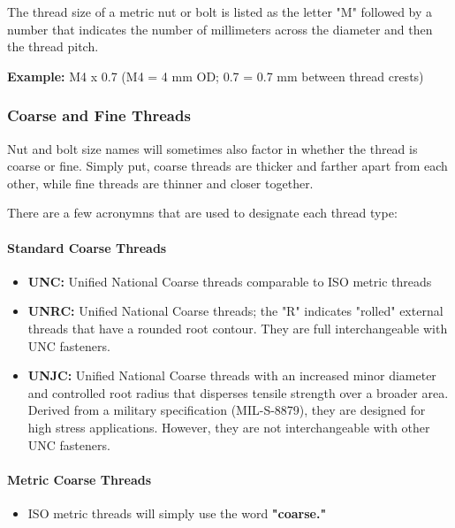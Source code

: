 \documentclass[english,]{article}
\providecommand{\tightlist}{%
  \setlength{\itemsep}{0pt}\setlength{\parskip}{0pt}}
\let\oldparagraph\paragraph
\renewcommand{\paragraph}[1]{\oldparagraph{#1}\mbox{}}
\begin{document}
\hypertarget{ibz5no}{}
The thread size of a metric nut or bolt is listed as the letter "M"
followed by a number that indicates the number of millimeters across the
diameter and then the thread pitch.

\hypertarget{ivmq62}{}
\textbf{Example:} M4 x 0.7 (M4 = 4 mm OD; 0.7 = 0.7 mm between thread
crests)

\hypertarget{ia6doav}{%
\subsubsection{Coarse and Fine Threads}\label{ia6doav}}

\hypertarget{i5h0xk}{}
Nut and bolt size names will sometimes also factor in whether the thread
is coarse or fine. Simply put, coarse threads are thicker and farther
apart from each other, while fine threads are thinner and closer
together.

\hypertarget{i56kg7}{}
There are a few acronymns that are used to designate each thread type:

\hypertarget{im72dg}{%
\paragraph{Standard Coarse Threads}\label{im72dg}}

\begin{itemize}
\tightlist
\item
  \textbf{UNC:} Unified National Coarse threads comparable to ISO metric
  threads
\item
  \textbf{UNRC:} Unified National Coarse threads; the "R" indicates
  "rolled" external threads that have a rounded root contour. They are
  full interchangeable with UNC fasteners.
\item
  \textbf{UNJC:} Unified National Coarse threads with an increased minor
  diameter and controlled root radius that disperses tensile strength
  over a broader area. Derived from a military specification
  (MIL-S-8879), they are designed for high stress applications. However,
  they are not interchangeable with other UNC fasteners.
\end{itemize}

\hypertarget{iyqv5s}{%
\paragraph{Metric Coarse Threads}\label{iyqv5s}}

\begin{itemize}
\tightlist
\item
  ISO metric threads will simply use the word \textbf{"coarse."}
\end{itemize}
\end{document}
